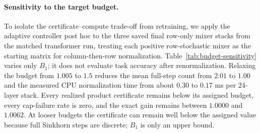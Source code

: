 \documentclass[10pt]{article}
\numberwithin{equation}{section}
\theoremstyle{plain}
\theoremstyle{definition}
\theoremstyle{remark}
\begin{document}
\paragraph{Sensitivity to the target budget.}
To isolate the certificate--compute trade-off from retraining, we apply the
adaptive controller post hoc to the three saved final row-only mixer stacks from
the matched transformer run, treating each positive row-stochastic mixer as the
starting matrix for column-then-row normalization. Table~\ref{tab:budget-sensitivity}
varies only \(B_1\); it does not evaluate task accuracy after renormalization.
Relaxing the budget from \(1.005\) to \(1.5\) reduces the mean full-step count
from \(2.01\) to \(1.00\) and the measured CPU normalization time from about
\(0.30\) to \(0.17\) ms per 24-layer stack.  Every realized product certificate
remains below its assigned budget, every cap-failure rate is zero, and the exact
gain remains between \(1.0000\) and \(1.0062\). At looser budgets the certificate can remain well below the assigned value because full Sinkhorn steps are discrete; \(B_1\) is only an upper bound.
\end{document}

